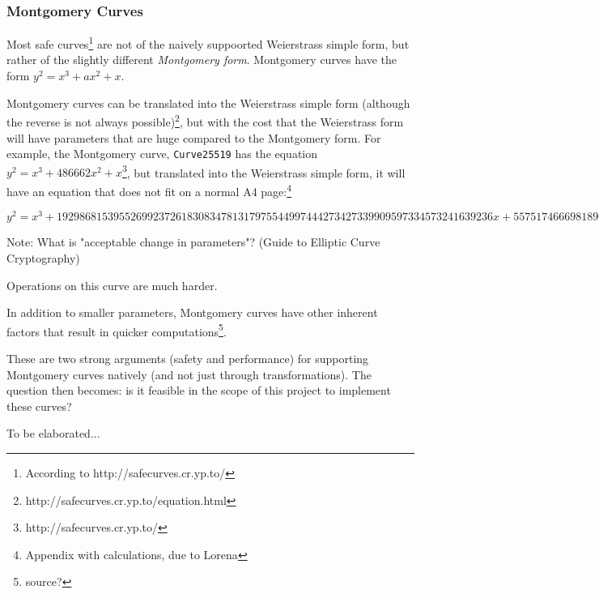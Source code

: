 \subsubsection{Montgomery Curves}

Most safe curves\footnote{According to http://safecurves.cr.yp.to/} are not of the naively suppoorted
Weierstrass simple form, but rather of the slightly different \emph{Montgomery form}. Montgomery curves
have the form \(y^2 = x^3 + ax^2 + x\).

Montgomery curves can be translated into the Weierstrass simple form (although the reverse is not always
possible)\footnote{http://safecurves.cr.yp.to/equation.html}, but with the cost that the Weierstrass form
will have parameters that are huge compared to the Montgomery form. For example, the Montgomery curve,
\verb|Curve25519| has the equation \(y^2 = x^3+486662x^2+x\)\footnote{http://safecurves.cr.yp.to/}, but
translated into the Weierstrass simple form, it will have an equation that does not fit on a normal A4
page:\footnote{Appendix with calculations, due to Lorena}

\begin{equation}
	y^2 =
	x^3 +
	19298681539552699237261830834781317975544997444273427339909597334573241639236x +
	55751746669818908907645289078257140818241103727901012315294400837956729358436
\end{equation}

Note: What is "acceptable change in parameters"? (Guide to Elliptic Curve Cryptography)

Operations on this curve are much harder.

In addition to smaller parameters, Montgomery curves have other inherent factors that result in quicker
computations\footnote{source?}.

These are two strong arguments (safety and performance) for supporting Montgomery curves natively (and
not just through transformations). The question then becomes: is it feasible in the scope of this
project to implement these curves?

To be elaborated...